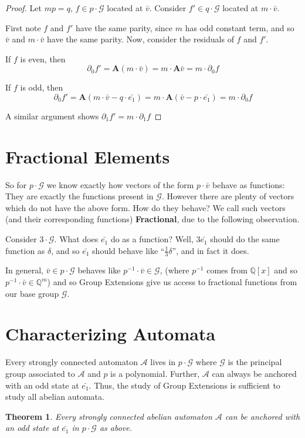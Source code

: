 \documentclass[12]{article}
\newcommand{\A}{\mathcal{A}}
\newcommand{\G}{\mathcal{G}}
\newcommand{\Q}{\mathbb{Q}}
\newcommand{\2}{\textbf{2}}
\newcommand{\Am}{\textbf{A}}
\newcommand{\del}{\partial}
\newcommand{\v}{\bar{v}}
\newtheorem{thm}{Theorem}
\begin{document}
\begin{proof}
  Let $mp = q$, $f \in p \cdot \G$ located at $\v$.
  Consider $f' \in q \cdot \G$ located at $m \cdot \v$.

  First note $f$ and $f'$ have the same parity, since 
  $m$ has odd constant term, and so $\v$ and $m \cdot \v$
  have the same parity. Now, consider the residuals of $f$ and $f'$. 
  
  If $f$ is even, then 
  \[ \del_0 f' = \Am (m \cdot \v) = m \cdot \Am \v = m \cdot \del_0 f \]

  If $f$ is odd, then
  \[ \del_0 f' = \Am (m \cdot \v - q \cdot \bar{e_1}) 
               = m \cdot \Am (\v - p \cdot \bar{e_1})
               = m \cdot \del_0 f \]

  A similar argument shows $\del_1 f' = m \cdot \del_1 f$
\end{proof}

\section{Fractional Elements}
So for $p \cdot \G$ we know exactly how vectors of the form $p \cdot \v$
behave as functions: They are exactly the functions present in $\G$.
However there are plenty of vectors which do not have the above form. 
How do they behave? We call such vectors (and their corresponding functions)
\textbf{Fractional}, due to the following observation.

Consider $3 \cdot \G$. What does $\bar{e_1}$ do as a function?
Well, $3\bar{e_1}$ should do the same function as $\delta$, and so
$\bar{e_1}$ should behave like ``$\frac{1}{3}\delta$'', and in fact it does.

In general, $\v \in p \cdot \G$ behaves like $p^{-1} \cdot \v \in \G$,
(where $p^{-1}$ comes from $\Q[x]$ and so $p^{-1} \cdot \v \in \Q^m$)
and so Group Extensions give us access to fractional functions from 
our base group $\G$.

\section{Characterizing Automata}
Every strongly connected automaton $\A$ lives in $p \cdot \G$ where 
$\G$ is the principal group associated to $\A$ and $p$ is a polynomial. 
Further, $\A$ can always be anchored with an odd state at $\bar{e_1}$. 
Thus, the study of Group Extensions is sufficient to study all abelian automata.

\begin{thm}
  Every strongly connected abelian automaton $\A$ can be anchored with an 
  odd state at $\bar{e_1}$ in $p \cdot \G$ as above.
\end{thm}
\end{document}
